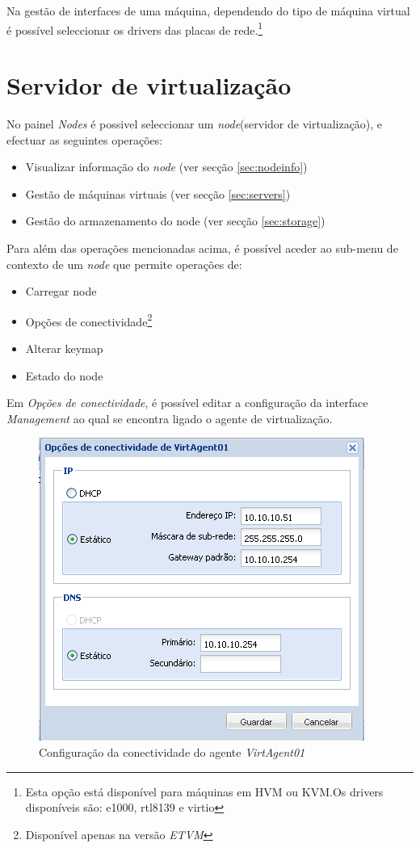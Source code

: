 Na gestão de interfaces de uma máquina, dependendo do tipo de máquina virtual é possível seleccionar os drivers das placas de rede.\footnote{Esta opção está disponível para máquinas em HVM ou KVM.Os drivers disponíveis são: e1000, rtl8139 e virtio}


\section{Servidor de virtualização}
\label{sec:node}

No painel \emph{Nodes} é possivel seleccionar um \emph{node}(servidor de virtualização), e efectuar as seguintes operações:
\begin{itemize}
    \item Visualizar informação do \emph{node} (ver secção \ref{sec:nodeinfo})
    \item Gestão de máquinas virtuais (ver secção \ref{sec:servers})
    \item Gestão do armazenamento do node (ver secção \ref{sec:storage})
\end{itemize}

Para além das operações mencionadas acima, é possível aceder ao sub-menu de contexto de um \emph{node} que permite operações de:
\begin{itemize}
    \item Carregar node
    \item Opções de conectividade\footnote{Disponível apenas na versão \emph{ETVM}}
    \item Alterar keymap
    \item Estado do node
\end{itemize}

Em \emph{Opções de conectividade}, é possível editar a configuração da interface \emph{Management} ao qual se encontra ligado o agente de virtualização.
\begin{figure}[H]
	\begin{center}
	\includegraphics[scale=0.5]{screenshots/node_conn.png}
	\caption{Configuração da conectividade do agente \emph{VirtAgent01}}
	\label{fig:node_conn}
	\end{center}
\end{figure}

